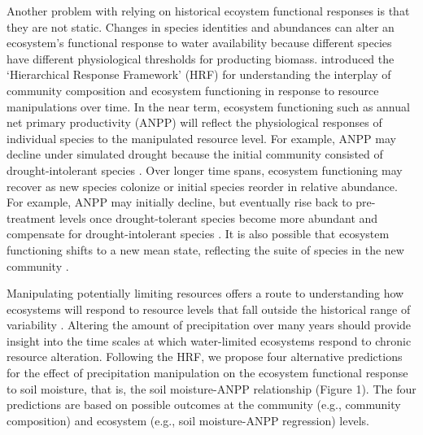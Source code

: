 \documentclass[fleqn,10pt,lineno]{wlpeerj} %
\begin{document}
Another problem with relying on historical ecoystem functional responses
is that they are not static. Changes in species identities and
abundances can alter an ecosystem's functional response to water
availability because different species have different physiological
thresholds for producting biomass. \citet{Smith2009} introduced the
`Hierarchical Response Framework' (HRF) for understanding the interplay
of community composition and ecosystem functioning in response to
resource manipulations over time. In the near term, ecosystem
functioning such as annual net primary productivity (ANPP) will reflect
the physiological responses of individual species to the manipulated
resource level. For example, ANPP may decline under simulated drought
because the initial community consisted of drought-intolerant species
\citep{Hoover2014}. Over longer time spans, ecosystem functioning may
recover as new species colonize or initial species reorder in relative
abundance. For example, ANPP may initially decline, but eventually rise
back to pre-treatment levels once drought-tolerant species become more
abundant and compensate for drought-intolerant species
\citep{Hoover2014}. It is also possible that ecosystem functioning
shifts to a new mean state, reflecting the suite of species in the new
community \citep{Knapp2012}.

Manipulating potentially limiting resources offers a route to
understanding how ecosystems will respond to resource levels that fall
outside the historical range of variability
\citep{Avolio2015, Gherardi2015, Knapp2017}. Altering the amount of
precipitation over many years should provide insight into the time
scales at which water-limited ecosystems respond to chronic resource
alteration. Following the HRF, we propose four alternative predictions
for the effect of precipitation manipulation on the ecosystem functional
response to soil moisture, that is, the soil moisture-ANPP relationship
(Figure 1). The four predictions are based on possible outcomes at the
community (e.g., community composition) and ecosystem (e.g., soil
moisture-ANPP regression) levels.
\end{document}
